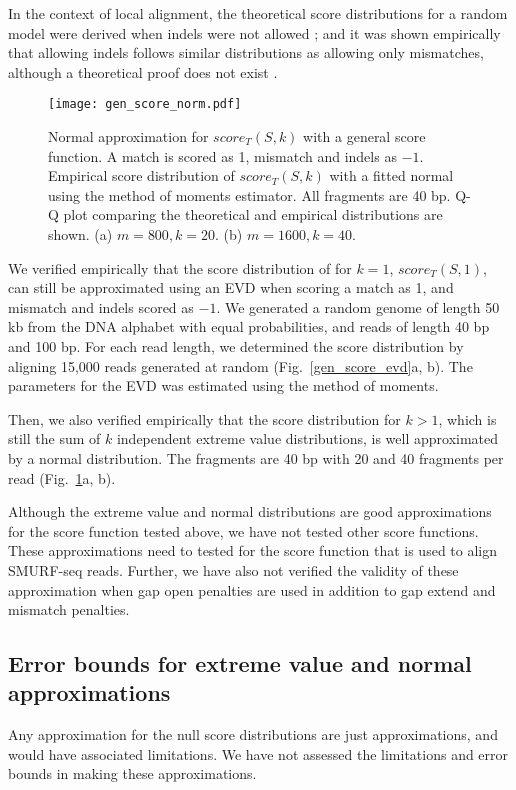 In the context of local alignment, the theoretical
score distributions for a random model were derived when indels were not
allowed \citep{karlin1990methods,karlin1990statistical}; and it was
shown empirically that allowing indels follows similar distributions as
allowing only mismatches, although a theoretical proof does not exist
\citep{pearson1998empirical,smith1985statistical,altschul199627}.

\begin{figure}[t!]
\centering
\texttt{[image: gen\_score\_norm.pdf]}
\caption[Normal approximation for $score_T(S,k)$ with a general score
  function]{
  Normal approximation for $score_T(S,k)$ with a general score function.
  A match is scored as 1, mismatch and indels as $-1$.
  Empirical score distribution of $score_T(S,k)$ with a fitted
  normal using the method of moments estimator. All fragments are 40 bp.
  Q-Q plot comparing the theoretical and empirical distributions are shown.
  (a) $m=800, k=20$.
  (b) $m=1600, k=40$.}
\label{gen_score_norm}
\end{figure}

We verified empirically that the score distribution of for $k=1$,
$score_T(S,1)$, can still be approximated using an EVD when scoring a
match as 1, and mismatch and indels scored as $-1$. We generated a
random genome of length 50 kb from the DNA alphabet with equal
probabilities, and reads of length 40 bp and 100 bp. For each read
length, we determined the score distribution by aligning 15,000 reads
generated at random (Fig.~\ref{gen_score_evd}a, b). The parameters for
the EVD was estimated using the method of moments.

Then, we also verified empirically that the score distribution for $k >
1$, which is still the sum of $k$ independent extreme value
distributions, is well approximated by a normal distribution. The
fragments are 40 bp with 20 and 40 fragments per read
(Fig.~\ref{gen_score_norm}a, b).


Although the extreme value and normal distributions are good
approximations for the score function tested above, we have not tested
other score functions. These approximations need to tested for the score
function that is used to align SMURF-seq reads. Further, we have also
not verified the validity of these approximation when gap open penalties
are used in addition to gap extend and mismatch penalties.

\subsection*{Error bounds for extreme value and normal approximations}
Any approximation for the null score distributions are just
approximations, and would have associated limitations. We have not
assessed the limitations and error bounds in making these
approximations.

